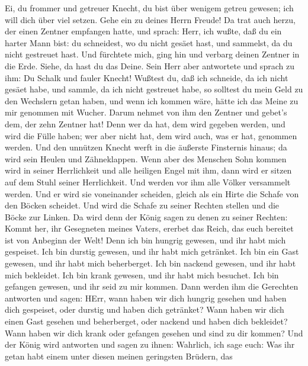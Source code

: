 Ei, du frommer und getreuer Knecht, du bist über wenigem getreu gewesen;
ich will dich über viel setzen. Gehe ein zu deines Herrn Freude!
 Da trat auch herzu, der einen Zentner empfangen hatte, und
sprach: Herr, ich wußte, daß du ein harter Mann bist: du schneidest, wo
du nicht gesäet hast, und sammelst, da du nicht gestreuet hast.
 Und fürchtete mich, ging hin und verbarg deinen Zentner in
die Erde. Siehe, da hast du das Deine.  Sein Herr aber
antwortete und sprach zu ihm: Du Schalk und fauler Knecht! Wußtest du,
daß ich schneide, da ich nicht gesäet habe, und sammle, da ich nicht
gestreuet habe,  so solltest du mein Geld zu den Wechslern
getan haben, und wenn ich kommen wäre, hätte ich das Meine zu mir
genommen mit Wucher.  Darum nehmet von ihm den Zentner und
gebet's dem, der zehn Zentner hat!  Denn wer da hat, dem
wird gegeben werden, und wird die Fülle haben; wer aber nicht hat, dem
wird auch, was er hat, genommen werden.  Und den unnützen
Knecht werft in die äußerste Finsternis hinaus; da wird sein Heulen und
Zähneklappen.  Wenn aber des Menschen Sohn kommen wird in
seiner Herrlichkeit und alle heiligen Engel mit ihm, dann wird er sitzen
auf dem Stuhl seiner Herrlichkeit.  Und werden vor ihm alle
Völker versammelt werden. Und er wird sie voneinander scheiden, gleich
als ein Hirte die Schafe von den Böcken scheidet.  Und wird
die Schafe zu seiner Rechten stellen und die Böcke zur Linken.
 Da wird denn der König sagen zu denen zu seiner Rechten:
Kommt her, ihr Gesegneten meines Vaters, ererbet das Reich, das euch
bereitet ist von Anbeginn der Welt!  Denn ich bin hungrig
gewesen, und ihr habt mich gespeiset. Ich bin durstig gewesen, und ihr
habt mich getränket. Ich bin ein Gast gewesen, und ihr habt mich
beherberget.  Ich bin nackend gewesen, und ihr habt mich
bekleidet. Ich bin krank gewesen, und ihr habt mich besuchet. Ich bin
gefangen gewesen, und ihr seid zu mir kommen.  Dann werden
ihm die Gerechten antworten und sagen: HErr, wann haben wir dich hungrig
gesehen und haben dich gespeiset, oder durstig und haben dich getränket?
 Wann haben wir dich einen Gast gesehen und beherberget,
oder nackend und haben dich bekleidet?  Wann haben wir dich
krank oder gefangen gesehen und sind zu dir kommen?  Und
der König wird antworten und sagen zu ihnen: Wahrlich, ich sage euch:
Was ihr getan habt einem unter diesen meinen geringsten Brüdern, das
